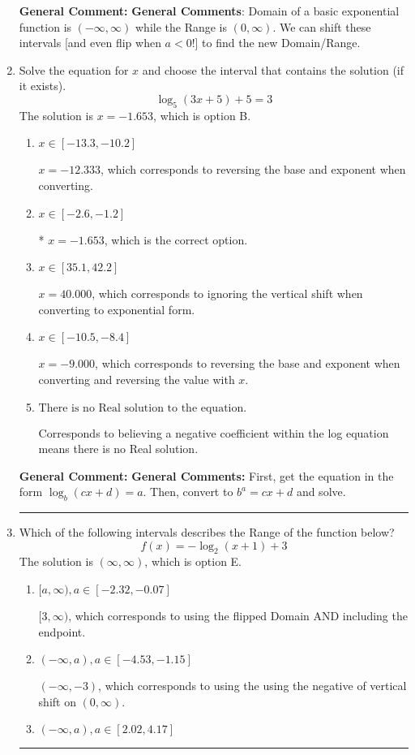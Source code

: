 \documentclass{extbook}[14pt]
\newcommand{\litem}[1]{\item #1

\rule{\textwidth}{0.4pt}}
\begin{document}
\begin{enumerate}
{\textbf{General Comment:} \textbf{General Comments}: Domain of a basic exponential function is $(-\infty, \infty)$ while the Range is $(0, \infty)$. We can shift these intervals [and even flip when $a<0$!] to find the new Domain/Range.
}
\litem{
Solve the equation for $x$ and choose the interval that contains the solution (if it exists).
\[ \log_{5}{(3x+5)}+5 = 3 \]The solution is \( x = -1.653 \), which is option B.\begin{enumerate}[label=\Alph*.]
\item \( x \in [-13.3, -10.2] \)

$x = -12.333$, which corresponds to reversing the base and exponent when converting.
\item \( x \in [-2.6, -1.2] \)

* $x = -1.653$, which is the correct option.
\item \( x \in [35.1, 42.2] \)

$x = 40.000$, which corresponds to ignoring the vertical shift when converting to exponential form.
\item \( x \in [-10.5, -8.4] \)

$x = -9.000$, which corresponds to reversing the base and exponent when converting and reversing the value with $x$.
\item \( \text{There is no Real solution to the equation.} \)

Corresponds to believing a negative coefficient within the log equation means there is no Real solution.
\end{enumerate}

\textbf{General Comment:} \textbf{General Comments:} First, get the equation in the form $\log_b{(cx+d)} = a$. Then, convert to $b^a = cx+d$ and solve.
}
\litem{
Which of the following intervals describes the Range of the function below?
\[ f(x) = -\log_2{(x+1)}+3 \]The solution is \( (\infty, \infty) \), which is option E.\begin{enumerate}[label=\Alph*.]
\item \( [a, \infty), a \in [-2.32, -0.07] \)

$[3, \infty)$, which corresponds to using the flipped Domain AND including the endpoint.
\item \( (-\infty, a), a \in [-4.53, -1.15] \)

$(-\infty, -3)$, which corresponds to using the using the negative of vertical shift on $(0, \infty)$.
\item \( (-\infty, a), a \in [2.02, 4.17] \)


\end{enumerate}}
\end{enumerate}
\end{document}
